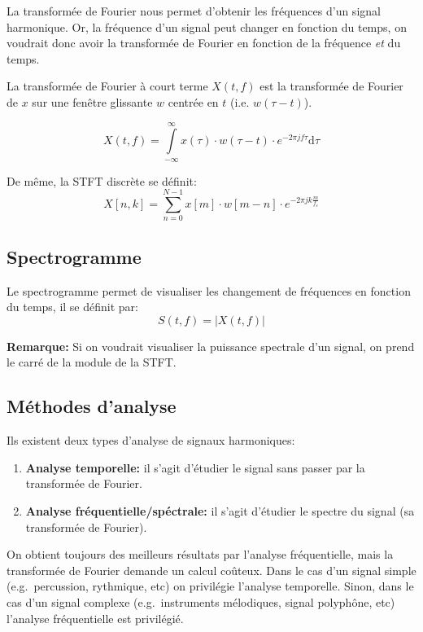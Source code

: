 \documentclass[]{article}
\providecommand{\tightlist}{%
  \setlength{\itemsep}{0pt}\setlength{\parskip}{0pt}}
\begin{document}
La transformée de Fourier nous permet d'obtenir les fréquences d'un
signal harmonique. Or, la fréquence d'un signal peut changer en fonction
du temps, on voudrait donc avoir la transformée de Fourier en fonction
de la fréquence \emph{et} du temps.

La transformée de Fourier à court terme \(X(t,f)\) est la transformée de
Fourier de \(x\) sur une fenêtre glissante \(w\) centrée en \(t\) (i.e.
\(w(\tau-t)\)).

\[X(t, f) = \int\limits_{-\infty}^{\infty} x(\tau)\cdot w(\tau-t)\cdot e^{-2\pi j f\tau} \mathrm{d}\tau \]

De même, la STFT discrète se définit:
\[X[n, k] = \sum\limits_{n=0}^{N-1} x[m]\cdot w[m-n]\cdot e^{-2\pi j k \frac{m}{f_s}}\]

\hypertarget{spectrogramme}{%
\subsection{Spectrogramme}\label{spectrogramme}}

Le spectrogramme permet de visualiser les changement de fréquences en
fonction du temps, il se définit par:
\[ S(t,f) = \left\lvert X(t,f) \right\rvert \]

\textbf{Remarque:} Si on voudrait visualiser la puissance spectrale d'un
signal, on prend le carré de la module de la STFT.

\hypertarget{methodes-danalyse}{%
\subsection{Méthodes d'analyse}\label{methodes-danalyse}}

Ils existent deux types d'analyse de signaux harmoniques:

\begin{enumerate}
\def\labelenumi{\arabic{enumi}.}
\tightlist
\item
  \textbf{Analyse temporelle:} il s'agit d'étudier le signal sans passer
  par la transformée de Fourier.
\item
  \textbf{Analyse fréquentielle/spéctrale:} il s'agit d'étudier le
  spectre du signal (sa transformée de Fourier).
\end{enumerate}

On obtient toujours des meilleurs résultats par l'analyse fréquentielle,
mais la transformée de Fourier demande un calcul coûteux. Dans le cas
d'un signal simple (e.g.~percussion, rythmique, etc) on privilégie
l'analyse temporelle. Sinon, dans le cas d'un signal complexe
(e.g.~instruments mélodiques, signal polyphône, etc) l'analyse
fréquentielle est privilégié.
\end{document}
